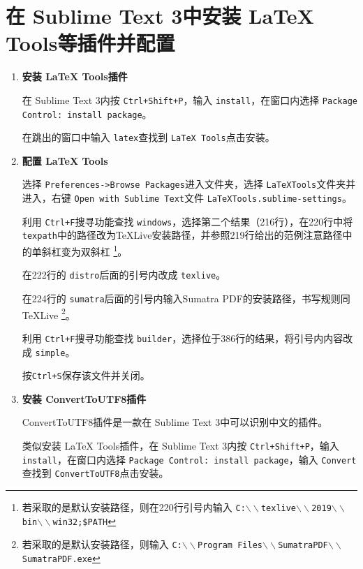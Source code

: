 \documentclass{ctexart}
\begin{document}
\section{在 Sublime Text 3中安装 LaTeX Tools等插件并配置}
% 
\begin{enumerate}[leftmargin=*]
\item[(1)]
\textbf{安装 LaTeX Tools插件}

在 Sublime Text 3内按 \texttt{Ctrl+Shift+P}，输入 \texttt{install}，在窗口内选择 \texttt{Package Control: install package}。

在跳出的窗口中输入 \texttt{latex}查找到 \texttt{LaTeX Tools}点击安装。
% 
\item[(2)]
\textbf{配置 LaTeX Tools}

选择 \texttt{Preferences->Browse Packages}进入文件夹，选择 \texttt{LaTeXTools}文件夹并进入，右键 \texttt{Open with Sublime Text}文件 \texttt{LaTeXTools.sublime-settings}。

利用 \texttt{Ctrl+F}搜寻功能查找 \texttt{windows}，选择第二个结果（216行），在220行中将 \texttt{texpath}中的路径改为TeXLive安装路径，并参照219行给出的范例注意路径中的单斜杠变为双斜杠
\footnote{若采取的是默认安装路径，则在220行引号内输入 \texttt{C:$\backslash \backslash$texlive$\backslash \backslash$2019$\backslash \backslash$bin$\backslash \backslash$win32;\$PATH}}。

在222行的 \texttt{distro}后面的引号内改成 \texttt{texlive}。

在224行的 \texttt{sumatra}后面的引号内输入Sumatra PDF的安装路径，书写规则同TeXLive
\footnote{若采取的是默认安装路径，则输入 \texttt{C:$\backslash \backslash$Program Files$\backslash \backslash$SumatraPDF$\backslash \backslash$SumatraPDF.exe}}。

利用 \texttt{Ctrl+F}搜寻功能查找 \texttt{builder}，选择位于386行的结果，将引号内内容改成 \texttt{simple}。

按\texttt{Ctrl+S}保存该文件并关闭。
% 
\item[(3)]
\textbf{安装 ConvertToUTF8插件}

ConvertToUTF8插件是一款在 Sublime Text 3中可以识别中文的插件。

类似安装 LaTeX Tools插件，在 Sublime Text 3内按 \texttt{Ctrl+Shift+P}，输入 \texttt{install}，在窗口内选择 \texttt{Package Control: install package}，输入 \texttt{Convert}查找到 \texttt{ConvertToUTF8}点击安装。
\end{enumerate}
% 
\end{document}
